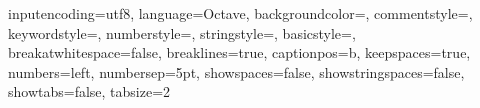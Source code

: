 


\usepackage[colorinlistoftodos]{todonotes}
\newcommand{\mynote}[1]{\todo[author=kks32,size=\small,inline,color=green!40]{#1}}

\usepackage{fancyvrb}
\usepackage{multicol}
\usepackage{listings}

\usepackage{color}
\usepackage{courier}


 {
	inputencoding=utf8,
	language=Octave,
	backgroundcolor=\color{white},
	commentstyle=\color{codegray},
	keywordstyle=\color{brownish},
	numberstyle=\tiny\color{codegray},
	stringstyle=\color{blueish},
	basicstyle=\scriptsize\ttfamily,
	breakatwhitespace=false,
	breaklines=true,
	captionpos=b,
	keepspaces=true,
	numbers=left,
	numbersep=5pt,
	showspaces=false,
	showstringspaces=false,
	showtabs=false,
	tabsize=2
}

\lstset{style=mystyle}
